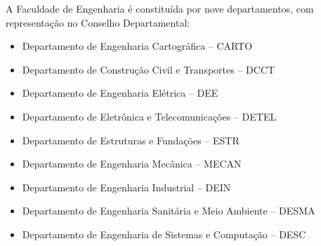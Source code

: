 A Faculdade de Engenharia é constituída por nove departamentos, com representação no Conselho Departamental:

\begin{itemize}
	\item Departamento de Engenharia Cartográfica -- CARTO
	\item Departamento de Construção Civil e Transportes -- DCCT
	\item Departamento de Engenharia Elétrica -- DEE
	\item Departamento de Eletrônica e Telecomunicações -- DETEL
	\item Departamento de Estruturas e Fundações -- ESTR
	\item Departamento de Engenharia Mecânica -- MECAN
	\item Departamento de Engenharia Industrial -- DEIN
	\item Departamento de Engenharia Sanitária e Meio Ambiente -- DESMA
	\item Departamento de Engenharia de Sistemas e Computação -- DESC
\end{itemize}

